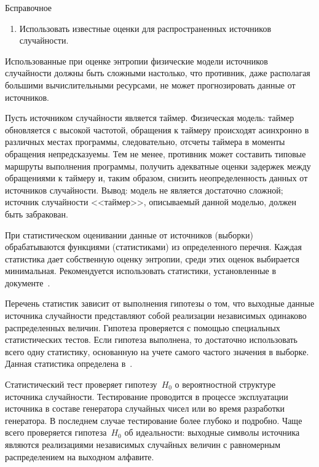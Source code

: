 \begin{appendix}{Б}{справочное}
\begin{enumerate}
\begin{example}
В проведенных экспериментах величина $h^*$ была не меньше $27,1$.
%
Нижняя граница достигалась для процессоров 
с минимально допустимой тактовой частотой $600$~МГц.
\end{example}

\item 
Использовать известные оценки для распространенных источников случайности.
\end{enumerate}

Использованные при оценке энтропии физические модели источников случайности 
должны быть сложными настолько, что противник, даже располагая большими 
вычислительными ресурсами, не может прогнозировать данные от источников. 

\begin{example}
Пусть источником случайности является таймер. 
Физическая модель: таймер обновляется с высокой частотой, обращения к 
таймеру происходят асинхронно в различных местах программы, 
следовательно, отсчеты таймера в моменты обращения непредсказуемы. 
Тем не менее, противник может составить типовые маршруты выполнения 
программы, получить адекватные оценки задержек между обращениями к 
таймеру и, таким образом, снизить неопределенность данных от 
источников случайности. Вывод: модель не является достаточно сложной; 
источник случайности <<таймер>>, описываемый данной моделью, должен быть 
забракован.
\end{example}

При статистическом оценивании данные от источников (выборки)
обрабатываются функциями (статистиками) из определенного перечня. 
Каждая статистика дает собственную оценку энтропии, среди этих оценок 
выбирается минимальная. Рекомендуется использовать статистики, установленные 
в документе~\cite{SP800-90B}.  

Перечень статистик зависит от выполнения гипотезы о том, что выходные 
данные источника случайности представляют собой реализации 
независимых одинаково распределенных величин. Гипотеза проверяется 
с помощью специальных статистических тестов.
%
Если гипотеза выполнена, то достаточно использовать всего одну статистику,
основанную на учете самого частого значения в выборке. Данная статистика определена 
в~\cite[п.~6.3.1]{SP800-90B}.


Статистический тест проверяет гипотезу~$H_0$ о вероятностной структуре 
источника случайности.
%
Тестирование проводится в процессе эксплуатации источника в составе 
генератора случайных чисел или во время разработки генератора.
%
В последнем случае тестирование более глубоко и подробно.
%
Чаще всего проверяется гипотеза~$H_0$ об идеальности:
выходные символы источника являются реализациями независимых случайных величин  
с равномерным распределением на выходном алфавите.


\end{appendix}

